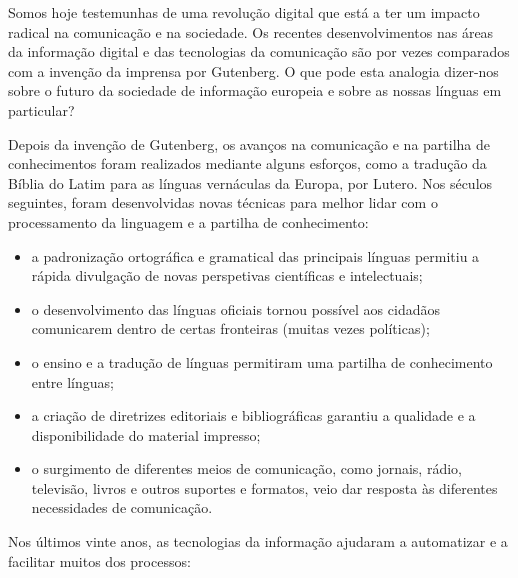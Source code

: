 \documentclass[]{../metanetpaper}
\begin{document}
\begin{multicols}{2}

Somos hoje testemunhas de uma revolução digital que está a ter um impacto radical na comunicação e na sociedade. Os recentes desenvolvimentos nas áreas da informação digital e das tecnologias da comunicação são por vezes comparados com a invenção da imprensa por Gutenberg. O que pode esta analogia dizer-nos sobre o futuro da sociedade de informação europeia e sobre as nossas línguas em particular?


Depois da invenção de Gutenberg, os avanços na comunicação e na partilha de conhecimentos foram realizados mediante alguns esforços, como a tradução da Bíblia do Latim para as línguas vernáculas da Europa, por Lutero. Nos séculos seguintes, foram desenvolvidas novas técnicas para melhor lidar com o processamento da linguagem e a partilha de co\-nhe\-ci\-men\-to:

\medskip
\begin{itemize}
   \item a padronização ortográfica e gramatical das principais línguas permitiu a rápida divulgação de novas perspetivas científicas e intelectuais;
      \item o desenvolvimento das línguas oficiais tornou possível aos cidadãos comunicarem dentro de certas fronteiras (muitas vezes políticas);
      \item o ensino e a tradução de línguas permitiram uma partilha de conhecimento entre línguas;
      \item a criação de diretrizes editoriais e bibliográficas garantiu a qualidade e a disponibilidade do material impresso;
      \item o surgimento de diferentes meios de comunicação, como jornais, rádio, televisão, livros e outros suportes e formatos, veio dar resposta às diferentes necessidades de comunicação. 
\end{itemize}

 Nos últimos vinte anos, as tecnologias da informação ajudaram a automatizar e a facilitar muitos dos processos:


\end{multicols}
\end{document}
